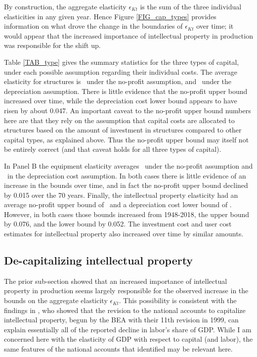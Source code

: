 \documentclass[11pt]{article}
\begin{document}
By construction, the aggregate elasticity $\epsilon_{Kt}$ is the sum of the three individual elasticities in any given year. Hence Figure \ref{FIG_cap_types} provides information on what drove the change in the boundaries of $\epsilon_{Kt}$ over time; it would appear that the increased importance of intellectual property in production was responsible for the shift up.

Table \ref{TAB_type} gives the summary statistics for the three types of capital, under each possible assumption regarding their individual costs. The average elasticity for structures is \basetnoprofit \ under the no-profit assumption, and \basestdepr \ under the depreciation assumption. There is little evidence that the no-profit upper bound increased over time, while the depreciation cost lower bound appears to have risen by about 0.047. An important caveat to the no-profit upper bound numbers here are that they rely on the assumption that capital costs are allocated to structures based on the amount of investment in structures compared to other capital types, as explained above. Thus the no-profit upper bound may itself not be entirely correct (and that caveat holds for all three types of capital).

In Panel B the equipment elasticity averages \baseeqnoprofit \ under the no-profit assumption and \baseeqdepr \ in the depreciation cost assumption. In both cases there is little evidence of an increase in the bounds over time, and in fact the no-profit upper bound declined by 0.015 over the 70 years. Finally, the intellectual property elasticity had an average no-profit upper bound of \baseipnoprofit \ and a depreciation cost lower bound of \baseipdepr. However, in both cases those bounds increased from 1948-2018, the upper bound by 0.076, and the lower bound by 0.052. The investment cost and user cost estimates for intellectual property also increased over time by similar amounts. 

\subsection{De-capitalizing intellectual property}
The prior sub-section showed that an increased importance of intellectual property in production seems largely responsible for the observed increase in the bounds on the aggregate elasticity $\epsilon_{Kt}$. This possibility is consistent with the findings in \cite{ksz2020}, who showed that the revision to the national accounts to capitalize intellectual property, begun by the BEA with their 11th revision in 1999, can explain essentially all of the reported decline in labor's share of GDP. While I am concerned here with the elasticity of GDP with respect to capital (and labor), the same features of the national accounts that \cite{ksz2020} identified may be relevant here. 
\end{document}
